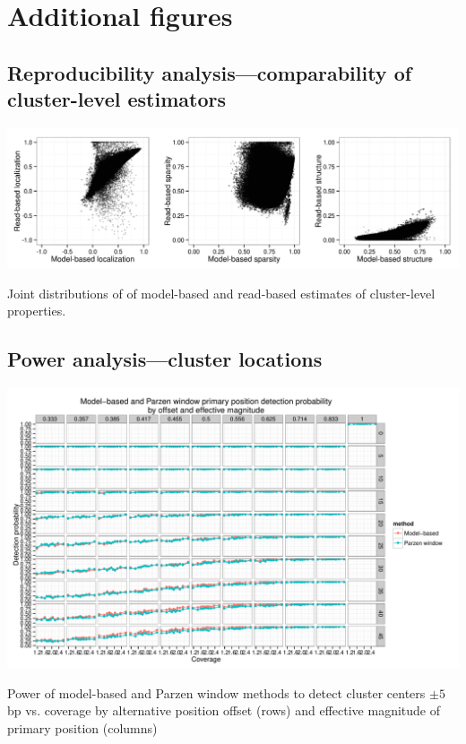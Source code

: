 \section{Additional figures}

\subsection{Reproducibility analysis---comparability of cluster-level estimators}

\begin{FPfigure}
\includegraphics[width=0.95\textheight,angle=90]{figures/nucleosomes/figure_cluster_reproducibility_methods}
\caption{Joint distributions of of model-based and read-based estimates of cluster-level properties. \label{supp:nucleosomes:fig:methodComparison}}
\end{FPfigure}
\afterpage{\clearpage}

\subsection{Power analysis---cluster locations}
\label{supp:nucleosomes:sec:cluster}

\begin{FPfigure}
\centering
\includegraphics[page=1,width=0.95\textheight,angle=90]{figures/nucleosomes/plots_compare_power}
\caption{Power of model-based and Parzen window methods to detect cluster centers $\pm 5$bp vs. coverage by alternative position offset (rows) and effective magnitude of primary position (columns)}
\end{FPfigure}
\afterpage{\clearpage}

